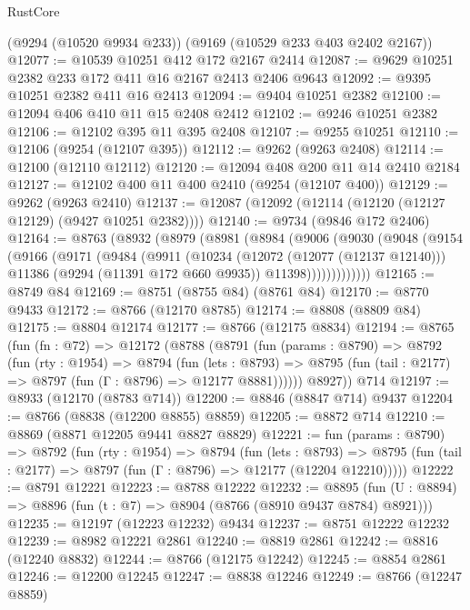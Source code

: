 \begin{lexlean}{RustCore}
\begin{coremodule}
    (@9294 (@10520 @9934 @233))
    (@9169 (@10529 @233 @403 @2402 @2167))
@12077 := @10539 @10251 @412 @172 @2167 @2414
@12087 := @9629 @10251 @2382 @233 @172 @411 @16 @2167 @2413 @2406 @9643
@12092 := @9395 @10251 @2382 @411 @16 @2413
@12094 := @9404 @10251 @2382
@12100 := @12094 @406 @410 @11 @15 @2408 @2412
@12102 := @9246 @10251 @2382
@12106 := @12102 @395 @11 @395 @2408
@12107 := @9255 @10251
@12110 := @12106 (@9254 (@12107 @395))
@12112 := @9262 (@9263 @2408)
@12114 := @12100 (@12110 @12112)
@12120 := @12094 @408 @200 @11 @14 @2410 @2184
@12127 := @12102 @400 @11 @400 @2410 (@9254 (@12107 @400))
@12129 := @9262 (@9263 @2410)
@12137 := @12087 (@12092 (@12114 (@12120 (@12127 @12129) (@9427 @10251 @2382))))
@12140 := @9734 (@9846 @172 @2406)
@12164 := @8763
    (@8932
      (@8979
        (@8981
          (@8984
            (@9006
              (@9030
                (@9048
                  (@9154
                    (@9166
                      (@9171
                        (@9484
                          (@9911
                            (@10234
                              (@12072 (@12077 (@12137 @12140)))
                              @11386
                              (@9294 (@11391 @172 @660 @9935))
                              @11398)))))))))))))
@12165 := @8749 @84
@12169 := @8751 (@8755 @84) (@8761 @84)
@12170 := @8770 @9433
@12172 := @8766 (@12170 @8785)
@12174 := @8808 (@8809 @84)
@12175 := @8804 @12174
@12177 := @8766 (@12175 @8834)
@12194 := @8765
    (fun (fn : @72) =>
    @12172
      (@8788
        (@8791
          (fun (params : @8790) =>
          @8792
            (fun (rty : @1954) =>
            @8794
              (fun (lets : @8793) =>
              @8795 (fun (tail : @2177) => @8797 (fun (Γ : @8796) => @12177 @8881))))))
        @8927))
    @714
@12197 := @8933 (@12170 (@8783 @714))
@12200 := @8846 (@8847 @714) @9437
@12204 := @8766 (@8838 (@12200 @8855) @8859)
@12205 := @8872 @714
@12210 := @8869 (@8871 @12205 @9441 @8827 @8829)
@12221 := fun (params : @8790) =>
  @8792
    (fun (rty : @1954) =>
    @8794
      (fun (lets : @8793) =>
      @8795 (fun (tail : @2177) => @8797 (fun (Γ : @8796) => @12177 (@12204 @12210)))))
@12222 := @8791 @12221
@12223 := @8788 @12222
@12232 := @8895 (fun (U : @8894) => @8896 (fun (t : @7) => @8904 (@8766 (@8910 @9437 @8784) @8921)))
@12235 := @12197 (@12223 @12232) @9434
@12237 := @8751 @12222 @12232
@12239 := @8982 @12221 @2861
@12240 := @8819 @2861
@12242 := @8816 (@12240 @8832)
@12244 := @8766 (@12175 @12242)
@12245 := @8854 @2861
@12246 := @12200 @12245
@12247 := @8838 @12246
@12249 := @8766 (@12247 @8859)

\end{coremodule}
\end{lexlean}
